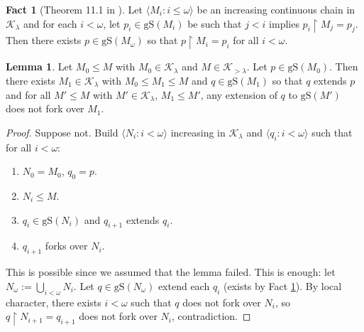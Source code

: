 \documentclass[12pt]{amsart}
\theoremstyle{definition}
\newtheorem{lem}[mydef]{Lemma}
\newtheorem{fact}[mydef]{Fact}
\begin{document}
\begin{fact}[Theorem 11.1 in \cite{baldwinbook09}]\label{limit-type}
  Let ${\langle {M_i : i \le \omega} \rangle}$ be an increasing continuous chain in ${\mathcal{K}}_\lambda$ and for each $i < \omega$, let $p_i \in {\text{gS}} (M_i)$ be such that $j < i$ implies $p_i {\upharpoonright} M_j = p_j$. Then there exists $p \in {\text{gS}} (M_\omega)$ so that $p {\upharpoonright} M_i = p_i$ for all $i < \omega$.
\end{fact}

\begin{lem}\label{minimal-ext}
  Let $M_0 {\le} M$ with $M_0 \in {\mathcal{K}}_\lambda$ and $M \in {\mathcal{K}}_{> \lambda}$. Let $p \in {\text{gS}} (M_0)$. Then there exists $M_1 \in {\mathcal{K}}_\lambda$ with $M_0 {\le} M_1 {\le} M$ and $q \in {\text{gS}} (M_1)$ so that $q$ extends $p$ and for all $M' {\le} M$ with $M' \in {\mathcal{K}}_\lambda$, $M_1 {\le} M'$, any extension of $q$ to ${\text{gS}} (M')$ does not fork over $M_1$.
\end{lem}
\begin{proof}
  Suppose not. Build ${\langle {N_i : i < \omega} \rangle}$ increasing in ${\mathcal{K}}_\lambda$ and ${\langle {q_i : i < \omega} \rangle}$ such that for all $i < \omega$:

  \begin{enumerate}
    \item $N_0 = M_0$, $q_0 = p$.
    \item $N_i {\le} M$.
    \item $q_i \in {\text{gS}} (N_i)$ and $q_{i + 1}$ extends $q_i$.
    \item $q_{i + 1}$ forks over $N_i$.
  \end{enumerate}

  This is possible since we assumed that the lemma failed. This is enough: let $N_\omega := \bigcup_{i < \omega} N_i$. Let $q \in {\text{gS}} (N_\omega)$ extend each $q_i$ (exists by Fact \ref{limit-type}). By local character, there exists $i < \omega$ such that $q$ does not fork over $N_i$, so $q {\upharpoonright} N_{i + 1} = q_{i + 1}$ does not fork over $N_i$, contradiction.
\end{proof}
\end{document}
